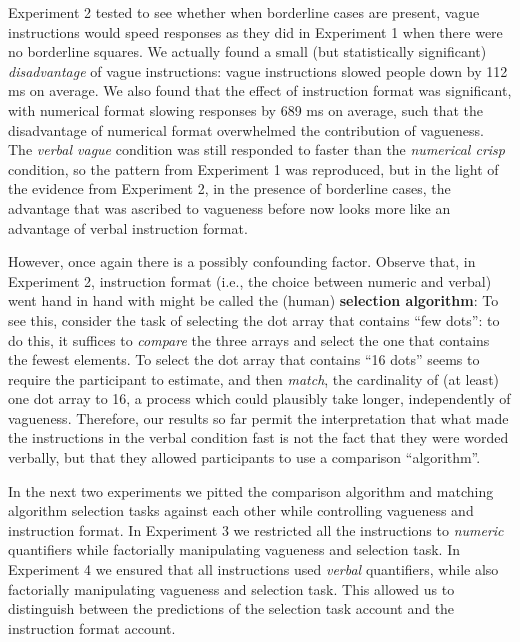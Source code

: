 Experiment 2 tested to see whether when borderline cases are present, vague instructions would speed responses as they did in Experiment 1 when there were no borderline squares. 
We actually found a small (but statistically significant) \emph{disadvantage} of vague instructions: vague instructions slowed people down by 112 ms on average. We also found that the effect of instruction format was significant, with numerical format slowing responses by 689 ms on average, such that the disadvantage of numerical format overwhelmed the contribution of vagueness. The \emph{verbal vague} condition was still responded to faster than the \emph{numerical crisp} condition, so the pattern from Experiment 1 was reproduced, but in the light of the evidence from Experiment 2, in the presence of borderline cases, the advantage that was ascribed to vagueness before now looks more like an advantage of verbal instruction format.

However, once again there is a possibly confounding factor. Observe that, in Experiment 2, instruction format (i.e., the choice between numeric and verbal) went hand in hand with might be called the (human) {\bf selection algorithm}: To see this, consider the task of selecting the dot array that contains ``few dots'': to do this, it suffices to {\em compare} the three arrays and select the one that contains the fewest elements.  To select the dot array that contains ``16 dots'' seems to require the participant to estimate, and then {\em match}, the cardinality of (at least) one dot array to 16, a process which could plausibly take longer, independently of vagueness. Therefore, our results so far permit the interpretation that what made the instructions in the verbal condition fast is not the fact that they were worded verbally, but that they allowed participants to use a comparison ``algorithm''.

In the next two experiments we pitted the comparison algorithm and matching algorithm selection tasks against each other while controlling vagueness and instruction format. In Experiment 3 we restricted all the instructions to \emph{numeric} quantifiers while factorially manipulating vagueness and selection task. In Experiment 4 we ensured that all instructions used \emph{verbal} quantifiers, while also factorially manipulating vagueness and selection task. This allowed us to distinguish between the predictions of the selection task account and the instruction format account. 

